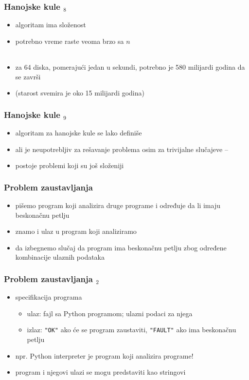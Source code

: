 \documentclass[utf8,compress,aspectratio=169]{beamer}
\begin{document}
\begin{frame}[fragile]
  \frametitle{Hanojske kule $_8$}
  \begin{itemize}
    \item algoritam ima  složenost
    \item potrebno vreme raste veoma brzo sa $n$ \\ \ \\
    \item za 64 diska, pomerajući jedan u sekundi, potrebno je 580 milijardi godina da se završi
    \item (starost svemira je oko 15 milijardi godina)
  \end{itemize}
\end{frame}

\begin{frame}[fragile]
  \frametitle{Hanojske kule $_9$}
  \begin{itemize}
    \item algoritam za hanojske kule se lako definiše
    \item ali je neupotrebljiv za rešavanje problema osim za trivijalne slučajeve -- 
    \item postoje problemi koji su još složeniji
  \end{itemize}
\end{frame}

\begin{frame}[fragile]
  \frametitle{Problem zaustavljanja}
  \begin{itemize}
    \item pišemo program koji analizira druge programe i određuje da li imaju beskonačnu petlju
    \item znamo i ulaz u program koji analiziramo
    \item da izbegnemo slučaj da program ima beskonačnu petlju zbog određene kombinacije ulaznih podataka
  \end{itemize}
\end{frame}

\begin{frame}[fragile]
  \frametitle{Problem zaustavljanja $_2$}
  \begin{itemize}
    \item specifikacija programa
  \begin{itemize}
    \item ulaz: fajl sa Python programom; ulazni podaci za njega
    \item izlaz: \texttt{"OK"} ako će se program zaustaviti, \texttt{"FAULT"} ako ima beskonačnu petlju
  \end{itemize}
  	\item npr. Python interpreter je program koji analizira programe!
  	\item program i njegovi ulazi se mogu predstaviti kao stringovi
  \end{itemize}
\end{frame}
\end{document}
